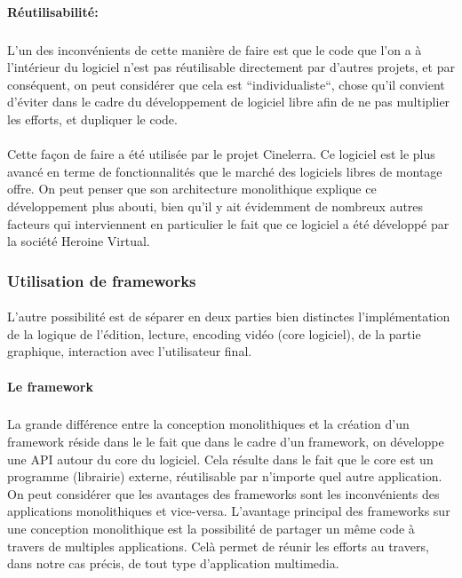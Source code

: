 \paragraph{Réutilisabilité:}

\subparagraph { }

L'un des inconvénients de cette manière de faire est que le code que
l'on a à l'intérieur du logiciel n'est pas réutilisable directement
par d'autres projets, et par conséquent, on peut considérer que cela
est ``individualiste``, chose qu'il convient d'éviter dans le cadre du
développement de logiciel libre afin de ne pas multiplier les efforts,
et dupliquer le code.

\paragraph{}

Cette façon de faire a été utilisée par le projet Cinelerra. Ce
logiciel est le plus avancé en terme de fonctionnalités que le
marché des logiciels libres de montage offre. On peut penser que son
architecture monolithique explique ce développement
plus abouti, bien qu'il y ait évidemment de nombreux autres facteurs qui
interviennent en particulier le fait que ce logiciel a été développé par
la société Heroine Virtual.

\subsubsection {Utilisation de  frameworks }

\paragraph{}

L'autre possibilité est de séparer en deux parties
bien distinctes l'implémentation de la logique de l'édition, lecture,
encoding vidéo (core logiciel), de la partie graphique, interaction
avec l'utilisateur final.

\paragraph {Le framework}

\subparagraph{}

La grande différence entre la conception monolithiques
 et la création d'un framework 
réside dans le le fait que dans le cadre d'un framework, on développe
une API  autour du core du logiciel. Cela résulte dans le
fait que le core est un programme (librairie) externe, réutilisable par
n'importe quel autre application.  On peut considérer que les avantages
des frameworks sont les inconvénients des applications monolithiques
 et vice-versa. L'avantage principal des frameworks sur
une conception monolithique est la possibilité de
partager un même code à travers de multiples applications. Celà permet de
réunir les efforts au travers, dans notre cas précis, de tout type
d'application multimedia.

